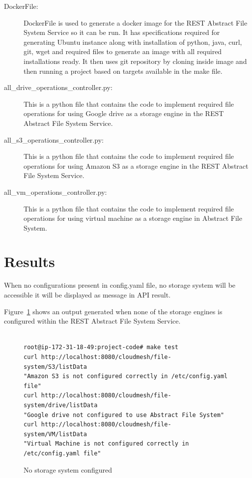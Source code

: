 \begin{description}
\item[DockerFile:]


  DockerFile is used to generate a docker image for the REST Abstract
  File System Service so it can be run.  It has specifications required for
  generating Ubuntu instance along with installation of python, java,
  curl, git, wget and required files to generate an image with all
  required installations ready. It then uses git repository by cloning
  inside image and then running a project based on targets available
  in the make file.

\item[all\_drive\_operations\_controller.py:] This is a python file
  that contains the code to implement required file operations for
  using Google drive as a storage engine in the REST Abstract File
  System Service.

\item[all\_s3\_operations\_controller.py:] This is a python file that
  contains the code to implement required file operations for using
  Amazon S3 as a storage engine in the REST Abstract File System
  Service.

\item[all\_vm\_operations\_controller.py:]

This is a python file that contains the code to implement required file 
operations for using virtual machine as a storage engine in Abstract File 
System. 

\end{description}



\section{Results}

When no configurations present in config.yaml file, no storage 
system will be accessible it will be displayed as message in 
API result.


Figure~\ref{fig:not-configured} shows an output generated when none of
the storage engines is configured within the REST Abstract File System
Service.


\begin{figure}[!ht]
\begin{footnotesize}
\begin{verbatim}

root@ip-172-31-18-49:project-code# make test
curl http://localhost:8080/cloudmesh/file-system/S3/listData
"Amazon S3 is not configured correctly in /etc/config.yaml file"
curl http://localhost:8080/cloudmesh/file-system/drive/listData
"Google drive not configured to use Abstract File System"
curl http://localhost:8080/cloudmesh/file-system/VM/listData
"Virtual Machine is not configured correctly in /etc/config.yaml file"

\end{verbatim}
\end{footnotesize}
\caption{No storage system configured}\label{fig:not-configured}
\end{figure}



